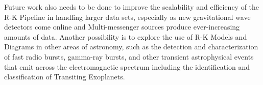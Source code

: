 Future work also needs to be done to improve the scalability and efficiency of the R-K Pipeline in handling larger data sets, especially as new gravitational wave detectors come online and Multi-messenger sources produce ever-increasing amounts of data. Another possibility is to explore the use of R-K Models and Diagrams in other areas of astronomy, such as the detection and characterization of fast radio bursts, gamma-ray bursts, and other transient astrophysical events that emit across the electromagnetic spectrum including the identification and classification of Transiting Exoplanets.